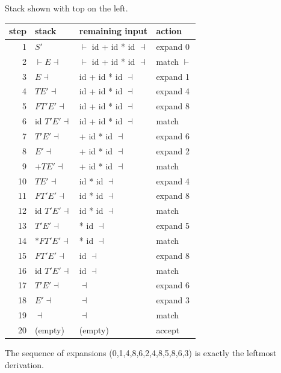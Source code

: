 \begin{example}
Stack shown with top on the left.
\begin{center}
\small
\begin{tabular}{rlll}
\toprule
step & stack & remaining input & action \\
\midrule
1 & $S'$ & $\vdash$ id + id * id $\dashv$ & expand 0 \\
2 & $\vdash E \dashv$ & $\vdash$ id + id * id $\dashv$ & match $\vdash$ \\
3 & $E \dashv$ & id + id * id $\dashv$ & expand 1 \\
4 & $T E' \dashv$ & id + id * id $\dashv$ & expand 4 \\
5 & $F T' E' \dashv$ & id + id * id $\dashv$ & expand 8 \\
6 & id $T' E' \dashv$ & id + id * id $\dashv$ & match \\
7 & $T' E' \dashv$ & + id * id $\dashv$ & expand 6 \\
8 & $E' \dashv$ & + id * id $\dashv$ & expand 2 \\
9 & $+ T E' \dashv$ & + id * id $\dashv$ & match \\
10 & $T E' \dashv$ & id * id $\dashv$ & expand 4 \\
11 & $F T' E' \dashv$ & id * id $\dashv$ & expand 8 \\
12 & id $T' E' \dashv$ & id * id $\dashv$ & match \\
13 & $T' E' \dashv$ & * id $\dashv$ & expand 5 \\
14 & $* F T' E' \dashv$ & * id $\dashv$ & match \\
15 & $F T' E' \dashv$ & id $\dashv$ & expand 8 \\
16 & id $T' E' \dashv$ & id $\dashv$ & match \\
17 & $T' E' \dashv$ & $\dashv$ & expand 6 \\
18 & $E' \dashv$ & $\dashv$ & expand 3 \\
19 & $\dashv$ & $\dashv$ & match \\
20 & (empty) & (empty) & accept \\
\bottomrule
\end{tabular}
\end{center}
The sequence of expansions (0,1,4,8,6,2,4,8,5,8,6,3) is exactly the leftmost derivation.
\end{example}

